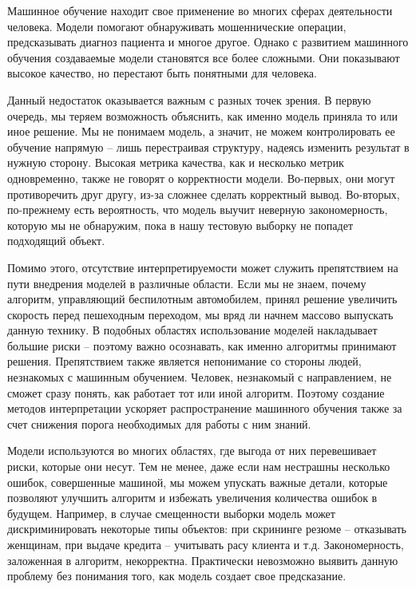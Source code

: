 Машинное обучение находит свое применение во многих сферах деятельности человека. Модели помогают обнаруживать мошеннические операции, предсказывать диагноз пациента и многое другое. Однако с развитием машинного обучения создаваемые модели становятся все более сложными. Они показывают высокое качество, но перестают быть понятными для человека.

Данный недостаток оказывается важным с разных точек зрения. В первую очередь, мы теряем возможность объяснить, как именно модель приняла то или иное решение. Мы не понимаем модель, а значит, не можем контролировать ее обучение напрямую -- лишь перестраивая структуру, надеясь изменить результат в нужную сторону. Высокая метрика качества, как и несколько метрик одновременно, также не говорят о корректности модели. Во-первых, они могут противоречить друг другу, из-за сложнее сделать корректный вывод. Во-вторых, по-прежнему есть вероятность, что модель выучит неверную закономерность, которую мы не обнаружим, пока в нашу тестовую выборку не попадет подходящий объект.

Помимо этого, отсутствие интерпретируемости может служить препятствием на пути внедрения моделей в различные области. Если мы не знаем, почему алгоритм, управляющий беспилотным автомобилем, принял решение увеличить скорость перед пешеходным переходом, мы вряд ли начнем массово выпускать данную технику. В подобных областях использование моделей накладывает большие риски -- поэтому важно осознавать, как именно алгоритмы принимают решения. Препятствием также является непонимание со стороны людей, незнакомых с машинным обучением. Человек, незнакомый с направлением, не сможет сразу понять, как работает тот или иной алгоритм. Поэтому создание методов интерпретации ускоряет распространение машинного обучения также за счет снижения порога необходимых для работы с ним знаний.

Модели используются во многих областях, где выгода от них перевешивает риски, которые они несут. Тем не менее, даже если нам нестрашны несколько ошибок, совершенные машиной, мы можем упускать важные детали, которые позволяют улучшить алгоритм и избежать увеличения количества ошибок в будущем. Например, в случае смещенности выборки модель может дискриминировать некоторые типы объектов: при скрининге резюме -- отказывать женщинам, при выдаче кредита -- учитывать расу клиента и т.д. Закономерность, заложенная в алгоритм, некорректна. Практически невозможно выявить данную проблему без понимания того, как модель создает свое предсказание.

